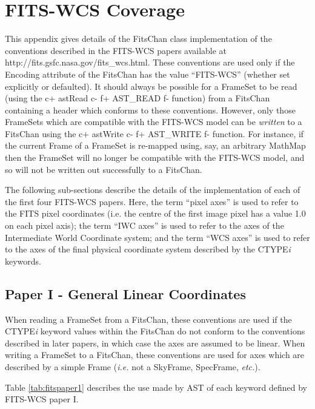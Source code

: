 \documentclass[twoside,11pt]{article}
\newcommand{\htmladdnormallink}[2]{#1}
\begin{document}
\newpage
\section{\label{ss:fitswcscoverage}FITS-WCS Coverage}

This appendix gives details of the FitsChan class
implementation of the conventions described in the FITS-WCS papers
available at
\htmladdnormallink{http://fits.gsfc.nasa.gov/fits\_wcs.html}
{http://fits.gsfc.nasa.gov/fits_wcs.html}. These conventions are
used only if the Encoding attribute of the FitsChan
has the value ``FITS-WCS'' (whether set explicitly or defaulted). It
should always be possible for a FrameSet to be read
(using the 
c+
astRead
c-
f+
AST\_READ
f-
function) from a FitsChan containing a header which conforms to these 
conventions. However, only those FrameSets which are compatible with the
FITS-WCS model can be \emph{written} to a FitsChan using the
c+
astWrite
c-
f+
AST\_WRITE
f-
function. For instance, if the current Frame of a
FrameSet is re-mapped using, say, an arbitrary MathMap
then the FrameSet will no longer be compatible with the FITS-WCS model,
and so will not be written out successfully to a FitsChan.

The following sub-sections describe the details of the implementation of
each of the first four FITS-WCS papers. Here, the term ``pixel axes'' is
used to refer to the FITS pixel coordinates (i.e. the centre of the 
first image pixel has a value 1.0 on each pixel axis); the term ``IWC 
axes'' is used to refer to the axes of the Intermediate World Coordinate 
system; and the term ``WCS axes'' is used to refer to the axes of the final 
physical coordinate system described by the CTYPE\emph{i} keywords.

\subsection{Paper I - General Linear Coordinates}
When reading a FrameSet from a FitsChan, these conventions are used if the CTYPE\emph{i} keyword
values within the FitsChan do not conform to the conventions described in
later papers, in which case the axes are assumed to be linear. When
writing a FrameSet to a FitsChan, these conventions are used for axes
which are described by a simple Frame (\emph{i.e.} not a 
SkyFrame, SpecFrame, \emph{etc.}).

Table \ref{tab:fitspaper1} describes the use made by AST of each keyword
defined by FITS-WCS paper I.
\end{document}
